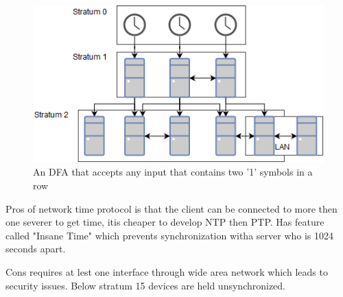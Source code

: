 \begin{figure}[h!]\label{}
	\centering
	\includegraphics[scale=0.4]{synchronization/fig/NTP.png}
	\caption{An DFA that accepts any input that contains two '1' symbols in a row}
	\label{fig:NTP}
\end{figure}
Pros of network time protocol is that the client can be connected to more then one severer to get time, itis cheaper to develop NTP then PTP. Has feature called "Insane Time" which prevents synchronization witha server who is 1024 seconds apart.


Cons requires at lest one interface through wide area network which leads to security issues. Below stratum
15 devices are held unsynchronized.